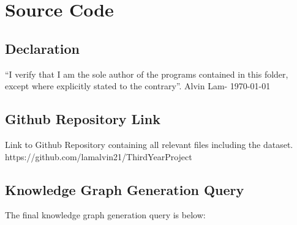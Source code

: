 \chapter{Source Code}
\section{Declaration}
``I verify that I am the sole author of the programs contained in this folder, except where explicitly stated to the contrary''. Alvin Lam- \today

\section{Github Repository Link}
Link to Github Repository containing all relevant files including the dataset. \\
https://github.com/lamalvin21/ThirdYearProject

\section{Knowledge Graph Generation Query}
The final knowledge graph generation query is below:


